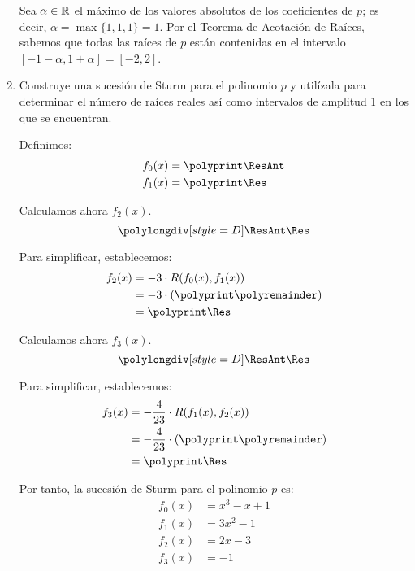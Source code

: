 \begin{ejercicio}
\begin{enumerate}
        Sea $\alpha\in \mathbb{R}$ el máximo de los valores absolutos de los coeficientes de $p$; es decir, $\alpha=\max\{1, 1, 1\}=1$.        
        Por el Teorema de Acotación de Raíces, sabemos que todas las raíces de $p$ están contenidas en el intervalo $[-1-\alpha, 1+\alpha]=[-2, 2]$.
        
        \item Construye una sucesión de Sturm para el polinomio $p$ y utilízala para determinar el número de raíces reales así como intervalos de amplitud 1 en los que se encuentran.
        
        \polymul{}
        \polymul{}
        Definimos:
        \begin{align*}
            f_0(x) &= \polyprint\ResAnt\\
            f_1(x) &= \polyprint\Res
        \end{align*}

        Calculamos ahora $f_2(x)$.
        \begin{equation*}
            \polylongdiv[style=D]\ResAnt\Res
        \end{equation*}
        \polydiv\div\ResAnt\Res
        \polymul\ResAnt{}
        \polymul\Res{}

        Para simplificar, establecemos:
        \begin{align*}
            f_2(x) &= -3\cdot R(f_0(x), f_1(x))\\
            &= -3\cdot \left(\polyprint\polyremainder\right)\\
            &= \polyprint\Res
        \end{align*}

        Calculamos ahora $f_3(x)$.
        \begin{equation*}
            \polylongdiv[style=D]\ResAnt\Res
        \end{equation*}
        \polydiv\div\ResAnt\Res
        \polymul\ResAnt{}
        \polymul\Res{}

        Para simplificar, establecemos:
        \begin{align*}
            f_3(x) &= -\frac{4}{23}\cdot R(f_1(x), f_2(x))\\
            &= -\frac{4}{23}\cdot \left(\polyprint\polyremainder\right)\\
            &= \polyprint\Res
        \end{align*}

        Por tanto, la sucesión de Sturm para el polinomio $p$ es:
        \begin{align*}
            f_0(x) &= x^3 - x + 1\\
            f_1(x) &= 3x^2 - 1\\
            f_2(x) &= 2x-3\\
            f_3(x) &= -1
        \end{align*}


\end{enumerate}
\end{ejercicio}
